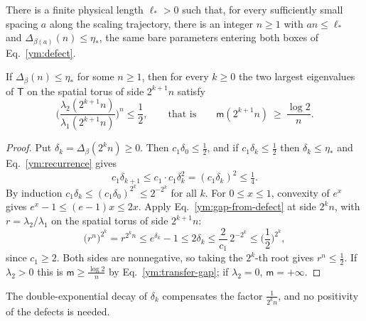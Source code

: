 \begin{conjecture}\label{ym:conj:defect}
There is a finite physical length $\ell_*>0$ such that, for every
sufficiently small spacing $a$ along the scaling trajectory, there is an
integer $n\ge1$ with $a n\le\ell_*$ and $\Delta_{\beta(a)}(n)\le\eta_*$,
the same bare parameters entering both boxes of Eq.~\eqref{ym:defect}.
\end{conjecture}
\begin{proposition}\label{ym:prop:conditional-gap}
If $\Delta_\beta(n)\le\eta_*$ for some $n\ge1$, then for every $k\ge0$ the two
largest eigenvalues of $\mathsf T$ on the spatial torus of side $2^{k+1}n$
satisfy
\begin{equation}\label{ym:conditional-gap}
 \Big(\frac{\lambda_2(2^{k+1}n)}{\lambda_1(2^{k+1}n)}\Big)^n\le\frac12,
 \qquad\text{that is}\qquad
 \mathsf m(2^{k+1}n)\ \ge\ \frac{\log2}{n}.
\end{equation}
\end{proposition}
\begin{proof}
Put $\delta_k=\Delta_\beta(2^kn)\ge0$. Then $c_1\delta_0\le\frac12$, and if
$c_1\delta_k\le\frac12$ then $\delta_k\le\eta_*$ and
Eq.~\eqref{ym:recurrence} gives
\begin{equation}
 c_1\delta_{k+1}\le c_1\cdot c_1\delta_k^2=(c_1\delta_k)^2\le\tfrac14 .
\end{equation}
By induction $c_1\delta_k\le(c_1\delta_0)^{2^k}\le2^{-2^k}$ for all $k$.
For $0\le x\le1$, convexity of $e^x$ gives $e^x-1\le(e-1)x\le2x$. Apply
Eq.~\eqref{ym:gap-from-defect} at side $2^kn$, with $r=\lambda_2/\lambda_1$
on the spatial torus of side $2^{k+1}n$:
\begin{equation}
 \big(r^n\big)^{2^k}=r^{2^kn}\le e^{\delta_k}-1\le2\delta_k
 \le\frac{2}{c_1}\,2^{-2^k}\le\Big(\frac12\Big)^{2^k},
\end{equation}
since $c_1\ge2$. Both sides are nonnegative, so taking the $2^k$-th root gives
$r^n\le\frac12$. If $\lambda_2>0$ this is $\mathsf m\ge\frac{\log2}{n}$ by
Eq.~\eqref{ym:transfer-gap}; if $\lambda_2=0$, $\mathsf m=+\infty$.
\end{proof}
The double-exponential decay of $\delta_k$ compensates the factor
$\frac{1}{2^kn}$, and no positivity of the defects is needed.


